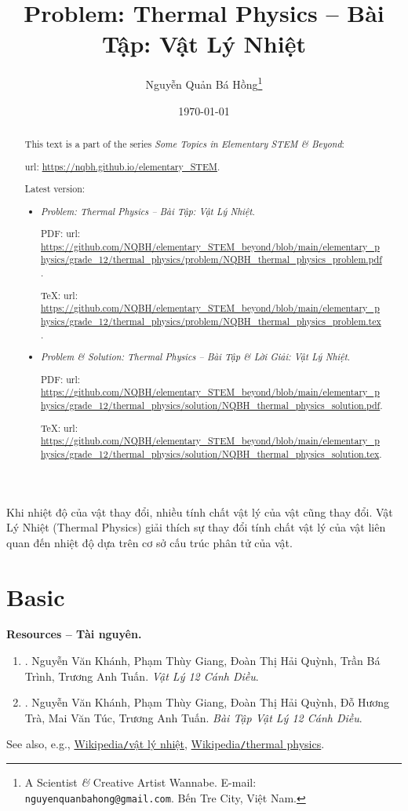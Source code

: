 \documentclass{article}
\title{Problem: Thermal Physics -- Bài Tập: Vật Lý Nhiệt}
\author{Nguyễn Quản Bá Hồng\footnote{A Scientist {\it\&} Creative Artist Wannabe. E-mail: {\tt nguyenquanbahong@gmail.com}. Bến Tre City, Việt Nam.}}
\date{\today}
\begin{document}
\maketitle
\begin{abstract}
	This text is a part of the series {\it Some Topics in Elementary STEM \& Beyond}:
	
	{\sc url}: \url{https://nqbh.github.io/elementary_STEM}.
	
	Latest version:
	\begin{itemize}
		\item {\it Problem: Thermal Physics -- Bài Tập: Vật Lý Nhiệt}.
		
		PDF: {\sc url}: \url{https://github.com/NQBH/elementary_STEM_beyond/blob/main/elementary_physics/grade_12/thermal_physics/problem/NQBH_thermal_physics_problem.pdf}.
		
		\TeX: {\sc url}: \url{https://github.com/NQBH/elementary_STEM_beyond/blob/main/elementary_physics/grade_12/thermal_physics/problem/NQBH_thermal_physics_problem.tex}.
		\item {\it Problem \& Solution: Thermal Physics -- Bài Tập \& Lời Giải: Vật Lý Nhiệt}.
		
		PDF: {\sc url}: \url{https://github.com/NQBH/elementary_STEM_beyond/blob/main/elementary_physics/grade_12/thermal_physics/solution/NQBH_thermal_physics_solution.pdf}.
		
		\TeX: {\sc url}: \url{https://github.com/NQBH/elementary_STEM_beyond/blob/main/elementary_physics/grade_12/thermal_physics/solution/NQBH_thermal_physics_solution.tex}.
	\end{itemize}
\end{abstract}
Khi nhiệt độ của vật thay đổi, nhiều tính chất vật lý của vật cũng thay đổi. Vật Lý Nhiệt (Thermal Physics) giải thích sự thay đổi tính chất vật lý của vật liên quan đến nhiệt độ dựa trên cơ sở cấu trúc phân tử của vật.

\tableofcontents


\section{Basic}
\textbf{\textsf{Resources -- Tài nguyên.}}
\begin{enumerate}
	\item \cite[Chủ đề 1: {\it Vật Lý Nhiệt}]{SGK_Vat_Ly_12_CD}. {\sc Nguyễn Văn Khánh, Phạm Thùy Giang, Đoàn Thị Hải Quỳnh, Trần Bá Trình, Trương Anh Tuấn}. {\it Vật Lý 12 Cánh Diều}.
	
	\item \cite[Chủ đề 1: {\it Vật Lý Nhiệt}]{SBT_Vat_Ly_12_CD}. {\sc Nguyễn Văn Khánh, Phạm Thùy Giang, Đoàn Thị Hải Quỳnh, Đỗ Hương Trà, Mai Văn Túc, Trương Anh Tuấn}. {\it Bài Tập Vật Lý 12 Cánh Diều}.
\end{enumerate}
See also, e.g., \href{https://vi.wikipedia.org/wiki/V%E1%BA%ADt_l%C3%BD_nhi%E1%BB%87t}{Wikipedia{\tt/}vật lý nhiệt}, \href{https://en.wikipedia.org/wiki/Thermal_physics}{Wikipedia{\tt/}thermal physics}.
\end{document}
